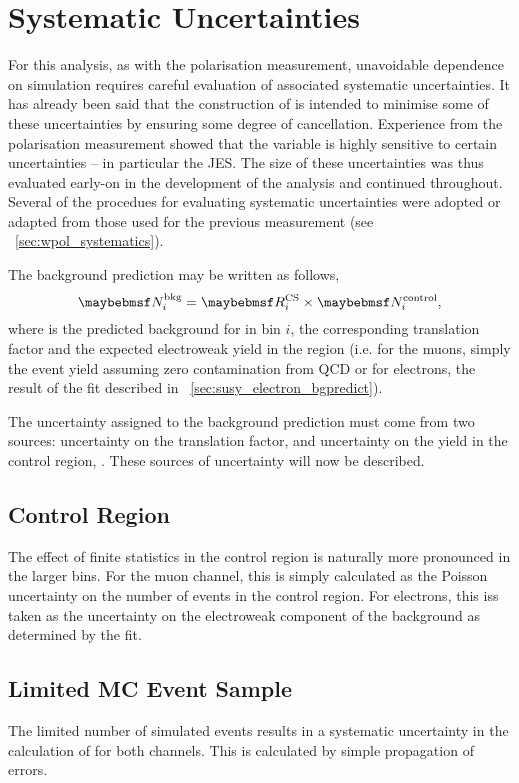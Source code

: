 \section{Systematic Uncertainties}
\label{sec:susy_systematics}
For this analysis, as with the \PW polarisation measurement, unavoidable
dependence on simulation requires careful evaluation of associated systematic
uncertainties. It has already been said that the construction of \RCS is
intended to minimise some of these uncertainties by ensuring some degree of
cancellation. Experience from the \PW polarisation measurement showed that the
\LP variable is highly sensitive to certain uncertainties -- in particular the
\ac{JES}. The size of these uncertainties was thus evaluated early-on in the
development of the analysis and continued throughout. Several of the procedues
for evaluating systematic uncertainties were adopted or adapted from those used
for the previous measurement (see \sec~\ref{sec:wpol_systematics}).

The background prediction may be written as follows,
\begin{equation*}
\NBkgi = \RCSi \times \NControli,
\end{equation*}
where \NBkgi is the predicted background for \LPsignal in \STlep bin $i$, \RCSi
the corresponding translation factor and \NControli the expected electroweak
yield in the region \LPcontrol (i.e. for the muons, simply the event yield
assuming zero contamination from \ac{QCD} or for electrons, the result of the
fit described in \sec~\ref{sec:susy_electron_bgpredict}).

The uncertainty assigned to the background prediction \NBkg must come from two
sources: uncertainty on the translation factor, \RCS and uncertainty on the yield
in the control region, \NControl. These sources of uncertainty will now be
described.

\subsection{Control Region \texorpdfstring{\LPcontrol}{\LPcontrolBM}}
The effect of finite statistics in the control region is naturally more
pronounced in the larger \STlep bins. For the muon channel, this is simply
calculated as the Poisson uncertainty on the number of events in the control
region. For electrons, this iss taken as the uncertainty on the electroweak
component of the background as determined by the fit.

\subsection{Limited \acl{MC} Event Sample}
\label{sec:susy_syst_mcstats}
The limited number of simulated events results in a systematic uncertainty in
the calculation of \RCS for both channels. This is calculated by simple
propagation of errors.

